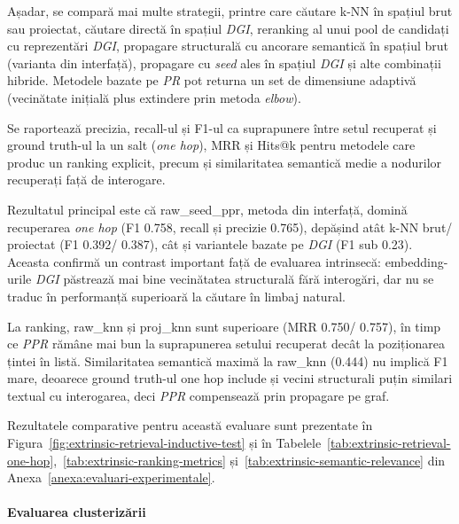 \documentclass[12pt]{article}
\numberwithin{equation}{section}
\numberwithin{figure}{section}
\numberwithin{table}{section}
\theoremstyle{definition}
\theoremstyle{plain}
\newcounter{anexa}
\begin{document}
Așadar, se compară mai multe strategii, printre care căutare k-NN în spațiul brut sau proiectat, căutare directă în spațiul \textit{DGI}, reranking al unui pool de candidați cu reprezentări \textit{DGI}, propagare structurală cu ancorare semantică în spațiul brut (varianta din interfață), propagare cu \textit{seed} ales în spațiul \textit{DGI} și alte combinații hibride. Metodele bazate pe \textit{PR} pot returna un set de dimensiune adaptivă (vecinătate inițială plus extindere prin metoda \textit{elbow}).

Se raportează precizia, recall-ul și F1-ul ca suprapunere între setul recuperat și ground truth-ul la un salt (\textit{one hop}), MRR și Hits@k pentru metodele care produc un ranking explicit, precum și similaritatea semantică medie a nodurilor recuperați față de interogare.

Rezultatul principal este că raw\_seed\_ppr, metoda din interfață, domină recuperarea \textit{one hop} (F1 0.758, recall și precizie 0.765), depășind atât k-NN brut/ proiectat (F1 0.392/ 0.387), cât și variantele bazate pe \textit{DGI} (F1 sub 0.23). Aceasta confirmă un contrast important față de evaluarea intrinsecă: embedding-urile \textit{DGI} păstrează mai bine vecinătatea structurală fără interogări, dar nu se traduc în performanță superioară la căutare în limbaj natural.

La ranking, raw\_knn și proj\_knn sunt superioare (MRR 0.750/ 0.757), în timp ce \textit{PPR} rămâne mai bun la suprapunerea setului recuperat decât la poziționarea țintei în listă. Similaritatea semantică maximă la raw\_knn (0.444) nu implică F1 mare, deoarece ground truth-ul one hop include și vecini structurali puțin similari textual cu interogarea, deci \textit{PPR} compensează prin propagare pe graf.

Rezultatele comparative pentru această evaluare sunt prezentate în Figura~\ref{fig:extrinsic-retrieval-inductive-test} și în Tabelele~\ref{tab:extrinsic-retrieval-one-hop},~\ref{tab:extrinsic-ranking-metrics} și~\ref{tab:extrinsic-semantic-relevance} din Anexa~\ref{anexa:evaluari-experimentale}.

\paragraph{Evaluarea clusterizării}
\end{document}
